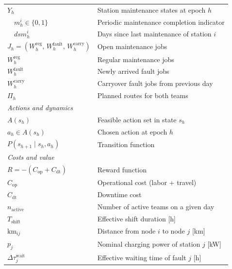 \documentclass[12pt,oneside]{article}
\begin{document}
\begin{longtable}{ll}
$Y_h$                                              & Station maintenance states at epoch $h$ \\
$\quad m_h^i \in \{0, 1\}$                        & Periodic maintenance completion indicator \\
$\quad \mathit{dsm}_h^i$                           & Days since last maintenance of station $i$ \\
$J_h = (W_h^{\mathrm{reg}},\, W_h^{\mathrm{fault}},\, W_h^{\mathrm{carry}})$ & Open maintenance jobs \\
$W_h^{\mathrm{reg}}$                              & Regular maintenance jobs \\
$W_h^{\mathrm{fault}}$                             & Newly arrived fault jobs \\
$W_h^{\mathrm{carry}}$                             & Carryover fault jobs from previous day \\
$\Pi_h$                                            & Planned routes for both teams \\[4pt]
\multicolumn{2}{l}{\textit{Actions and dynamics}} \\[2pt]
$A(s_h)$                                           & Feasible action set in state $s_h$ \\
$a_h \in A(s_h)$                                  & Chosen action at epoch $h$ \\
$P(s_{h+1} \mid s_h, a_h)$                        & Transition function \\[4pt]
\multicolumn{2}{l}{\textit{Costs and value}} \\[2pt]
$R = -(C_{\mathrm{op}} + C_{\mathrm{dt}})$       & Reward function \\
$C_{\mathrm{op}}$                                  & Operational cost (labor + travel) \\
$C_{\mathrm{dt}}$                                  & Downtime cost \\
$n_{\mathrm{active}}$                             & Number of active teams on a given day \\
$T_{\mathrm{shift}}$                              & Effective shift duration [h] \\
$\mathrm{km}_{ij}$                                & Distance from node $i$ to node $j$ [km] \\
$p_j$                                              & Nominal charging power of station $j$ [kW] \\
$\Delta\tau_j^{\mathrm{wait}}$                    & Effective waiting time of fault $j$ [h] \\

\end{longtable}
\end{document}
